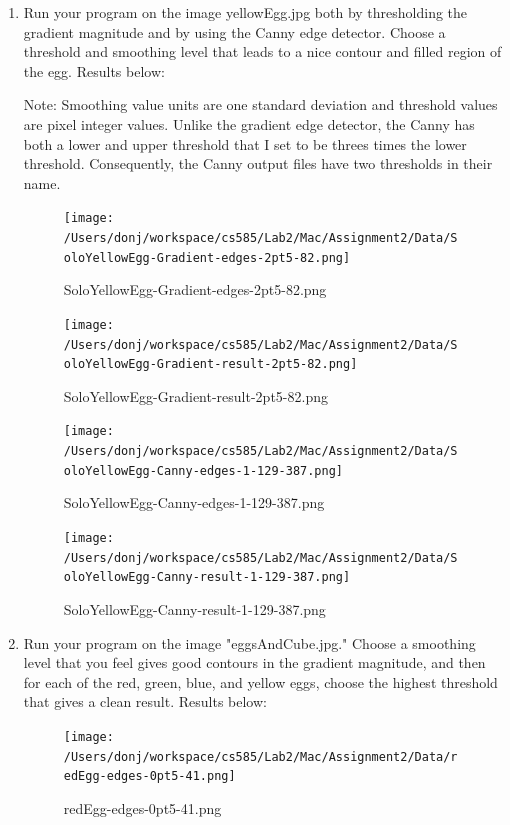 \documentclass{article}
\begin{document}
\begin{enumerate}

\item
Run your program on the image yellowEgg.jpg both by thresholding the gradient magnitude and by using the Canny edge detector. Choose a threshold and smoothing level that leads to a nice contour and filled region of the egg. Results below:

Note: Smoothing value units are one standard deviation and threshold values are pixel integer values. Unlike the gradient edge detector, the Canny has both a lower and upper threshold that I set to be threes times the lower threshold. Consequently, the Canny output files have two thresholds in their name.

\begin{figure}[!htbp]
\centering
\texttt{[image: /Users/donj/workspace/cs585/Lab2/Mac/Assignment2/Data/SoloYellowEgg-Gradient-edges-2pt5-82.png]}
\caption{SoloYellowEgg-Gradient-edges-2pt5-82.png}
\label{overflow}
\end{figure}

\begin{figure}[H]
\centering
\texttt{[image: /Users/donj/workspace/cs585/Lab2/Mac/Assignment2/Data/SoloYellowEgg-Gradient-result-2pt5-82.png]}
\caption{SoloYellowEgg-Gradient-result-2pt5-82.png}
\label{overflow}
\end{figure}

\begin{figure}[H]
\centering
\texttt{[image: /Users/donj/workspace/cs585/Lab2/Mac/Assignment2/Data/SoloYellowEgg-Canny-edges-1-129-387.png]}
\caption{SoloYellowEgg-Canny-edges-1-129-387.png}
\label{overflow}
\end{figure}

\begin{figure}[H]
\centering
\texttt{[image: /Users/donj/workspace/cs585/Lab2/Mac/Assignment2/Data/SoloYellowEgg-Canny-result-1-129-387.png]}
\caption{SoloYellowEgg-Canny-result-1-129-387.png}
\label{overflow}
\end{figure}

\item
Run your program on the image "eggsAndCube.jpg." Choose a smoothing level that you feel gives good contours in the gradient magnitude, and then for each of the red, green, blue, and yellow eggs, choose the highest threshold that gives a clean result. Results below:

\begin{figure}[H]
\centering
\texttt{[image: /Users/donj/workspace/cs585/Lab2/Mac/Assignment2/Data/redEgg-edges-0pt5-41.png]}
\caption{redEgg-edges-0pt5-41.png}
\label{overflow}
\end{figure}


\end{enumerate}
\end{document}
